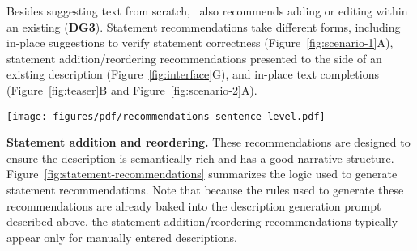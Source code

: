 {\vspace{.5em}
\vspace{.5em}

\noindent{}Besides suggesting text from scratch, \pluto~also recommends adding or editing  within an existing  (\textbf{DG3}).
Statement recommendations take different forms, including in-place suggestions to verify statement correctness (Figure~\ref{fig:scenario-1}A), statement addition/reordering recommendations presented to the side of an existing description (Figure~\ref{fig:interface}G), and in-place text completions (Figure~\ref{fig:teaser}B and Figure~\ref{fig:scenario-2}A).

\begin{figure*}[t!]
    \centering
    \texttt{[image: figures/pdf/recommendations-sentence-level.pdf]}
    \caption{Overview of the description statement recommendations in \pluto. The system uses a combination of the chart's specification, data, the active description, and selections on the chart to recommend changes to the description.}
    \label{fig:statement-recommendations}
\end{figure*}

\textbf{Statement addition and reordering.}
These recommendations are designed to ensure the description is semantically rich and has a good narrative structure.
Figure~\ref{fig:statement-recommendations} summarizes the logic used to generate statement recommendations.
Note that because the rules used to generate these recommendations are already baked into the description generation prompt described above, the statement addition/reordering recommendations typically appear only for manually entered descriptions.

}
